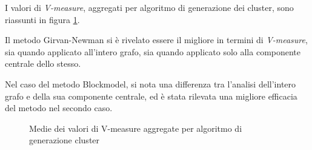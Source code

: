 \documentclass[12pt,a4paper,twoside]{report}
\begin{document}
I valori di \textit{V-measure}, aggregati per algoritmo di generazione dei cluster, sono riassunti
in figura \ref{img:vmeasurecluster}.

Il metodo Girvan-Newman si è rivelato essere il migliore in termini di \textit{V-measure}, sia
quando applicato all'intero grafo, sia quando applicato solo alla componente centrale dello stesso.

Nel caso del metodo Blockmodel, si nota una differenza tra l'analisi dell'intero grafo e della sua
componente centrale, ed è stata rilevata una migliore efficacia del metodo nel secondo caso.

\begin{figure}[H]
    \begin{minipage}[c]{0.60\textwidth}
    \setlength{\fboxrule}{0pt}	%
    \end{minipage}
    \begin{minipage}[c]{0.32\textwidth}
    \caption{Medie dei valori di V-measure aggregate per algoritmo di generazione cluster }
    \label{img:vmeasurecluster}
    \end{minipage}
\end{figure}

\end{document}
